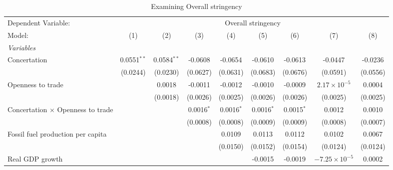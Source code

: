 
\begin{table}[htbp]
   \caption{Examining Overall stringency}
   \centering
   \begin{tabular}{lcccccccc}
      \tabularnewline \midrule \midrule
      Dependent Variable: & \multicolumn{8}{c}{Overall stringency}\\
      Model:                                   & (1)           & (2)           & (3)          & (4)          & (5)          & (6)          & (7)                    & (8)\\  
      \midrule
      \emph{Variables}\\
      Concertation                             & 0.0551$^{**}$ & 0.0584$^{**}$ & -0.0608      & -0.0654      & -0.0610      & -0.0613      & -0.0447                & -0.0236\\   
                                               & (0.0244)      & (0.0230)      & (0.0627)     & (0.0631)     & (0.0683)     & (0.0676)     & (0.0591)               & (0.0556)\\   
      Openness to trade                        &               & 0.0018        & -0.0011      & -0.0012      & -0.0010      & -0.0009      & $2.17\times 10^{-5}$   & 0.0004\\   
                                               &               & (0.0018)      & (0.0026)     & (0.0025)     & (0.0026)     & (0.0026)     & (0.0025)               & (0.0025)\\   
      Concertation $\times$ Openness to trade  &               &               & 0.0016$^{*}$ & 0.0016$^{*}$ & 0.0016$^{*}$ & 0.0015$^{*}$ & 0.0012                 & 0.0010\\   
                                               &               &               & (0.0008)     & (0.0008)     & (0.0009)     & (0.0009)     & (0.0008)               & (0.0007)\\   
      Fossil fuel production per capita        &               &               &              & 0.0109       & 0.0113       & 0.0112       & 0.0102                 & 0.0067\\   
                                               &               &               &              & (0.0150)     & (0.0152)     & (0.0154)     & (0.0124)               & (0.0124)\\   
      Real GDP growth                          &               &               &              &              & -0.0015      & -0.0019      & $-7.25\times 10^{-5}$  & 0.0002\\   

\end{tabular}
\end{table}
